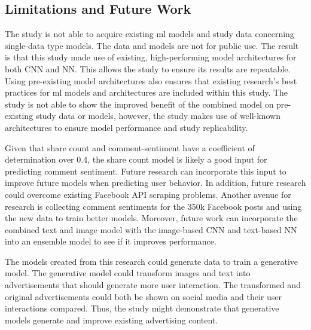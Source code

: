 \documentclass[mksc,blindrev]{informs3} %
\begin{document}
\subsection{Limitations and Future Work}

The study is not able to acquire existing ml models and study data concerning single-data type models. The data and models are not for public use. The result is that this study made use of existing, high-performing model architectures for both CNN and NN. This allows the study to ensure its results are repeatable. Using pre-existing model architectures also ensures that existing research's best practices for ml models and architectures are included within this study. The study is not able to show the improved benefit of the combined model on pre-existing study data or models, however, the study makes use of well-known architectures to ensure model performance and study replicability. 

Given that share count and comment-sentiment have a coefficient of determination over 0.4, the share count model is likely a good input for predicting comment sentiment. Future research can incorporate this input to improve future models when predicting user behavior. In addition, future research could overcome existing Facebook API scraping problems. Another avenue for research is collecting comment sentiments for the 350k Facebook posts and using the new data to train better models.  Moreover, future work can incorporate the combined text and image model with the image-based CNN and text-based NN into an ensemble model to see if it improves performance.

The models created from this research could generate data to train a generative model.  The generative model could transform images and text into advertisements that should generate more user interaction.  The transformed and original advertisements could both be shown on social media and their user interactions compared. Thus, the study might demonstrate that generative models generate and improve existing advertising content.






%
%
%
\end{document}
